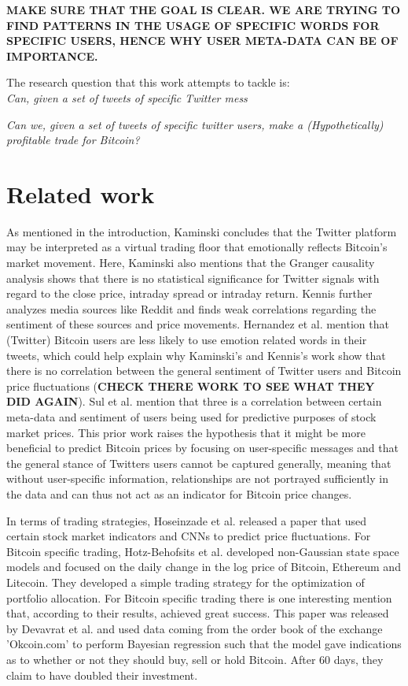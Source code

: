 \documentclass{article}
\begin{document}
\textbf{MAKE SURE THAT THE GOAL IS CLEAR. WE ARE TRYING TO FIND PATTERNS IN THE USAGE OF SPECIFIC WORDS FOR SPECIFIC USERS, HENCE WHY USER META-DATA CAN BE OF IMPORTANCE.}


The research question that this work attempts to tackle is: \\
\textit{Can, given a set of tweets of specific Twitter mess}

\textit{Can we, given a set of tweets of specific twitter users, make a (Hypothetically) profitable trade for Bitcoin?}

\section{Related work}
As mentioned in the introduction, Kaminski \cite{1406.7577} concludes that the Twitter platform may be interpreted as a virtual trading floor that emotionally reflects Bitcoin's market movement. Here, Kaminski also mentions that the Granger causality analysis shows that there is no statistical significance for Twitter signals with regard to the close price, intraday spread or intraday return. Kennis \cite{1811.03146} further analyzes media sources like Reddit and finds weak correlations regarding the sentiment of these sources and price movements. Hernandez et al. \cite{inproceedings} mention that (Twitter) Bitcoin users are less likely to use emotion related words in their tweets, which could help explain why Kaminski's and Kennis's work show that there is no correlation between the general sentiment of Twitter users and Bitcoin price fluctuations (\textbf{CHECK THERE WORK TO SEE WHAT THEY DID AGAIN}). Sul et al.  \cite{sul2017trading} mention that three is a correlation between certain meta-data and sentiment of users being used for predictive purposes of stock market prices. This prior work raises the hypothesis that it might be more beneficial to predict Bitcoin prices by focusing on user-specific messages and that the general stance of Twitters users cannot be captured generally, meaning that without user-specific information, relationships are not portrayed sufficiently in the data and can thus not act as an indicator for Bitcoin price changes.

In terms of trading strategies, Hoseinzade et al. \cite{1810.08923} released a paper that used certain stock market indicators and CNNs to predict price fluctuations. For Bitcoin specific trading, Hotz-Behofsits et al. \cite{1801.06373} developed non-Gaussian state space models and focused on the daily change in the log price of Bitcoin, Ethereum and Litecoin. They developed a simple trading strategy for the optimization of portfolio allocation. For Bitcoin specific trading there is one interesting mention that, according to their results, achieved great success. This paper was released by Devavrat et al. \cite{1410.1231} and used data coming from the order book of the exchange 'Okcoin.com' to perform Bayesian regression such that the model gave indications as to whether or not they should buy, sell or hold Bitcoin. After 60 days, they claim to have doubled their investment.
\end{document}
